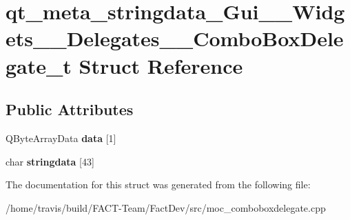 \hypertarget{structqt__meta__stringdata__Gui____Widgets____Delegates____ComboBoxDelegate__t}{\section{qt\-\_\-meta\-\_\-stringdata\-\_\-\-Gui\-\_\-\-\_\-\-Widgets\-\_\-\-\_\-\-Delegates\-\_\-\-\_\-\-Combo\-Box\-Delegate\-\_\-t Struct Reference}
\label{structqt__meta__stringdata__Gui____Widgets____Delegates____ComboBoxDelegate__t}
}
\subsection*{Public Attributes}
\begin{DoxyCompactItemize}
\item 
\hypertarget{structqt__meta__stringdata__Gui____Widgets____Delegates____ComboBoxDelegate__t_a5c25fe095138104c36bbd481381d5274}{Q\-Byte\-Array\-Data {\bfseries data} \mbox{[}1\mbox{]}}\label{structqt__meta__stringdata__Gui____Widgets____Delegates____ComboBoxDelegate__t_a5c25fe095138104c36bbd481381d5274}

\item 
\hypertarget{structqt__meta__stringdata__Gui____Widgets____Delegates____ComboBoxDelegate__t_a201e312bdf09944683961743704cb4ca}{char {\bfseries stringdata} \mbox{[}43\mbox{]}}\label{structqt__meta__stringdata__Gui____Widgets____Delegates____ComboBoxDelegate__t_a201e312bdf09944683961743704cb4ca}

\end{DoxyCompactItemize}


The documentation for this struct was generated from the following file\-:\begin{DoxyCompactItemize}
\item 
/home/travis/build/\-F\-A\-C\-T-\/\-Team/\-Fact\-Dev/src/moc\-\_\-comboboxdelegate.\-cpp\end{DoxyCompactItemize}
